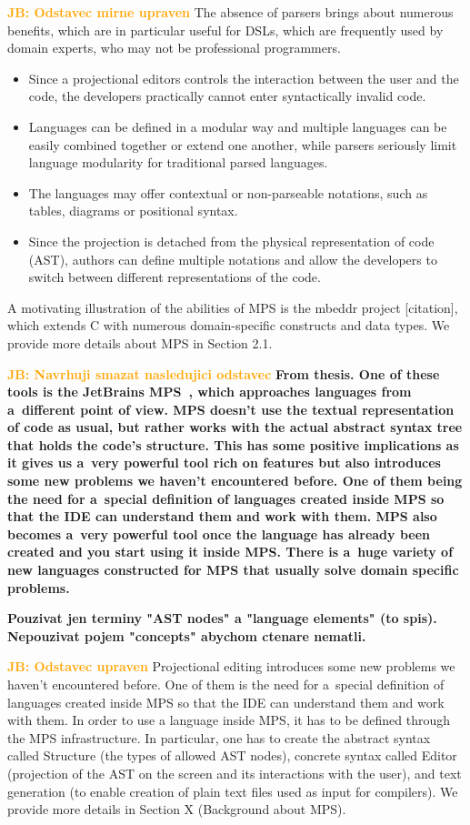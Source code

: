 \documentclass[10pt]{sigplanconf}
\newcommand{\todo}[1]{{\bfseries #1}}
\newcommand{\JB}[1]{\textcolor{orange}{\bfseries JB: #1}} %
\begin{document}
\JB{Odstavec mirne upraven} The absence of parsers brings about numerous benefits, which are in particular useful for DSLs, which are frequently used by domain experts, who may not be professional programmers.
\begin{itemize}
	\item Since a projectional editors controls the interaction between the user and the code, the developers practically cannot enter syntactically invalid code.
	\item Languages can be defined in a modular way and multiple languages can be easily combined together or extend one another, while parsers seriously limit language modularity for traditional parsed languages.
	\item The languages may offer contextual or non-parseable notations, such as tables, diagrams or positional syntax.
	\item Since the projection is detached from the physical representation of code (AST), authors can define multiple notations and allow the developers to switch between different representations of the code.
\end{itemize}
A motivating illustration of the abilities of MPS is the mbeddr project [citation], which extends C with numerous domain-specific constructs and data types.
We provide more details about MPS in Section 2.1.

\JB{Navrhuji smazat nasledujici odstavec}
\todo{From thesis.
	One of these tools is the JetBrains MPS~\cite{ref:MPS}, which approaches languages from a~different point of view.
	MPS doesn't use the textual representation of code as usual, but rather works with the actual abstract syntax tree that holds the code's structure.
	This has some positive implications as it gives us a~very powerful tool rich on features but also introduces some new problems we haven't encountered before.
	One of them being the need for a~special definition of languages created inside MPS so that the IDE can understand them and work with them.
	MPS also becomes a~very powerful tool once the language has already been created and you start using it inside MPS.
	There is a~huge variety of new languages constructed for MPS that usually solve domain specific problems.
}

\todo{Pouzivat jen terminy "AST nodes" a "language elements" (to spis). Nepouzivat pojem "concepts" abychom ctenare nematli.}

\JB{Odstavec upraven} Projectional editing introduces some new problems we haven't encountered before. One of them is the need for a~special definition of languages created inside MPS so that the IDE can understand them and work with them. In order to use a language inside MPS, it has to be defined through the MPS infrastructure. In particular, one has to create the abstract syntax called Structure (the types of allowed AST nodes), concrete syntax called Editor (projection of the AST on the screen and its interactions with the user), and text generation (to enable creation of plain text files used as input for compilers). We provide more details in Section X (Background about MPS).
\end{document}
